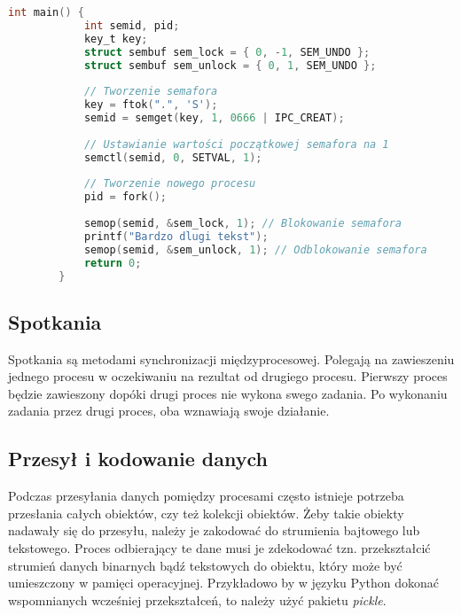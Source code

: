 {{\begin{lstlisting}[caption=Przykładowa implementacja synchronizacji z procesem potomnym w języku~C, language=C, label=proc_sem]
        int main() {
            int semid, pid;
            key_t key;
            struct sembuf sem_lock = { 0, -1, SEM_UNDO };
            struct sembuf sem_unlock = { 0, 1, SEM_UNDO };
        
            // Tworzenie semafora
            key = ftok(".", 'S');
            semid = semget(key, 1, 0666 | IPC_CREAT);
        
            // Ustawianie wartości początkowej semafora na 1
            semctl(semid, 0, SETVAL, 1);
        
            // Tworzenie nowego procesu
            pid = fork();
        
            semop(semid, &sem_lock, 1); // Blokowanie semafora
            printf("Bardzo dlugi tekst");
            semop(semid, &sem_unlock, 1); // Odblokowanie semafora
            return 0;
        }
        \end{lstlisting}
    }
    \subsection{Spotkania}
    {
        Spotkania są metodami synchronizacji międzyprocesowej. Polegają na zawieszeniu jednego procesu w oczekiwaniu na rezultat od drugiego procesu. Pierwszy proces będzie zawieszony dopóki drugi proces nie wykona swego zadania. Po wykonaniu zadania przez drugi proces, oba wznawiają swoje działanie.
    }
    \subsection{Przesył i kodowanie danych}
    {
        Podczas przesyłania danych pomiędzy procesami często istnieje potrzeba przesłania całych obiektów, czy też kolekcji obiektów. Żeby takie obiekty nadawały się do przesyłu, należy je zakodować do strumienia bajtowego lub tekstowego. Proces odbierający te dane musi je zdekodować tzn. przekształcić strumień danych binarnych bądź tekstowych do obiektu, który może być umieszczony w pamięci operacyjnej. Przykładowo by w języku Python dokonać wspomnianych wcześniej przekształceń, to należy użyć pakietu \textit{pickle}. 
    }
}